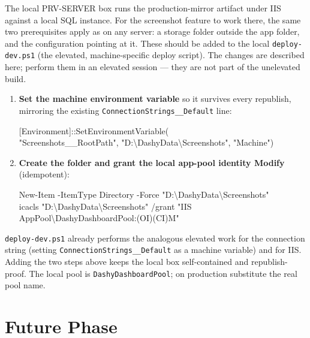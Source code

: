 \documentclass[12pt,a4paper]{report}
\begin{document}
The local PRV-SERVER box runs the production-mirror artifact under IIS against a local SQL instance.
For the screenshot feature to work there, the same two prerequisites apply as on any server: a
storage folder outside the app folder, and the configuration pointing at it. These should be added
to the local \texttt{deploy-dev.ps1} (the elevated, machine-specific deploy script). The changes are
described here; perform them in an elevated session --- they are not part of the unelevated build.

\begin{enumerate}
  \item \textbf{Set the machine environment variable} so it survives every republish, mirroring the
        existing \texttt{ConnectionStrings\_\_Default} line:
  \begin{codebox}
  \ttfamily\small
  [Environment]::SetEnvironmentVariable(\\
  \hspace*{2em}"Screenshots\_\_RootPath", "D:\textbackslash DashyData\textbackslash Screenshots", "Machine")
  \end{codebox}

  \item \textbf{Create the folder and grant the local app-pool identity Modify} (idempotent):
  \begin{codebox}
  \ttfamily\small
  New-Item -ItemType Directory -Force "D:\textbackslash DashyData\textbackslash Screenshots"\\
  icacls "D:\textbackslash DashyData\textbackslash Screenshots" /grant "IIS AppPool\textbackslash DashyDashboardPool:(OI)(CI)M"
  \end{codebox}
\end{enumerate}

\begin{notebox}
\texttt{deploy-dev.ps1} already performs the analogous elevated work for the connection string
(setting \texttt{ConnectionStrings\_\_Default} as a machine variable) and for IIS. Adding the two
steps above keeps the local box self-contained and republish-proof. The local pool is
\texttt{DashyDashboardPool}; on production substitute the real pool name.
\end{notebox}

\chapter{Future Phase}
\label{ch:future}
\end{document}
